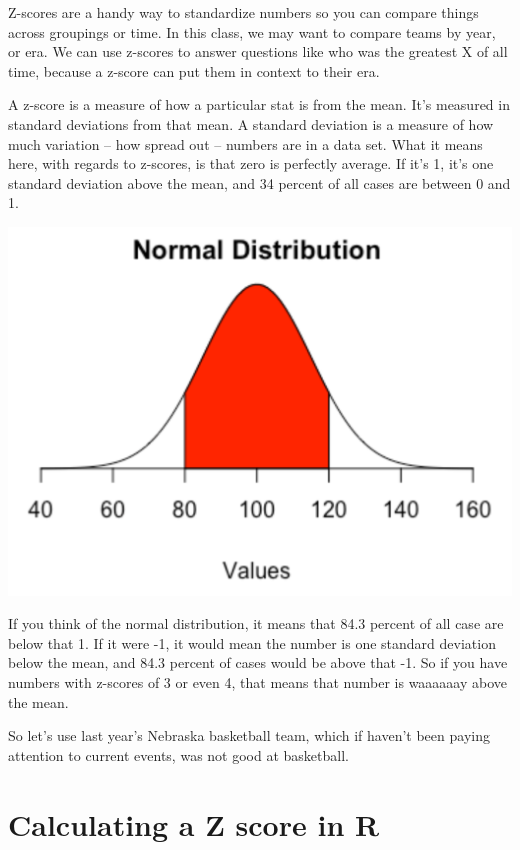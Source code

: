 \documentclass[
]{book}
\begin{document}
Z-scores are a handy way to standardize numbers so you can compare things across groupings or time. In this class, we may want to compare teams by year, or era. We can use z-scores to answer questions like who was the greatest X of all time, because a z-score can put them in context to their era.

A z-score is a measure of how a particular stat is from the mean. It's measured in standard deviations from that mean. A standard deviation is a measure of how much variation -- how spread out -- numbers are in a data set. What it means here, with regards to z-scores, is that zero is perfectly average. If it's 1, it's one standard deviation above the mean, and 34 percent of all cases are between 0 and 1.

\includegraphics[width=17.64in]{images/simulations2}

If you think of the normal distribution, it means that 84.3 percent of all case are below that 1. If it were -1, it would mean the number is one standard deviation below the mean, and 84.3 percent of cases would be above that -1. So if you have numbers with z-scores of 3 or even 4, that means that number is waaaaaay above the mean.

So let's use last year's Nebraska basketball team, which if haven't been paying attention to current events, was not good at basketball.

\hypertarget{calculating-a-z-score-in-r}{%
\section{Calculating a Z score in R}\label{calculating-a-z-score-in-r}}
\end{document}
